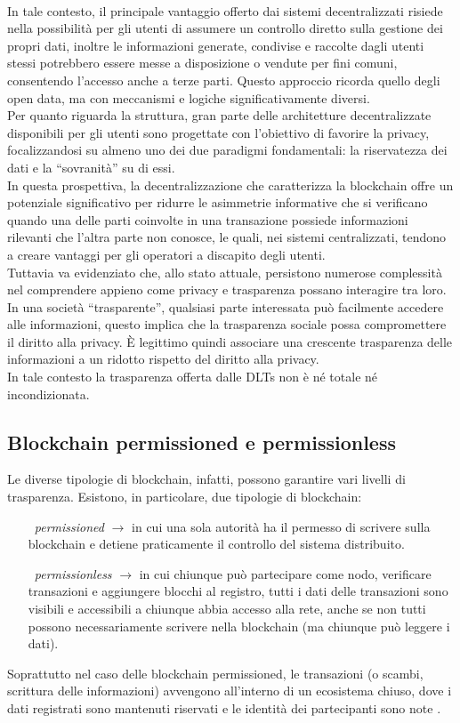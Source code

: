 \\In tale contesto, il principale vantaggio offerto dai sistemi decentralizzati risiede nella possibilità per gli utenti di assumere un controllo diretto sulla gestione dei propri dati, inoltre le informazioni generate, condivise e raccolte dagli utenti stessi potrebbero essere messe a disposizione o vendute per fini comuni,
consentendo l'accesso anche a terze parti. Questo approccio ricorda quello degli open data, ma con meccanismi e logiche significativamente diversi.
\\Per quanto riguarda la struttura, gran parte delle architetture decentralizzate disponibili per gli utenti sono progettate con l'obiettivo di favorire la privacy, focalizzandosi su almeno uno dei due paradigmi fondamentali: la riservatezza dei dati e la “sovranità” su di essi.
\\In questa prospettiva, la decentralizzazione che caratterizza la blockchain offre un potenziale significativo per ridurre le asimmetrie informative che si verificano quando una delle parti coinvolte in una transazione possiede informazioni rilevanti che l'altra parte non conosce, le quali, nei sistemi centralizzati, tendono a creare vantaggi per gli operatori a discapito degli utenti.
\\Tuttavia va evidenziato che, allo stato attuale, persistono numerose complessità nel comprendere appieno come privacy e trasparenza possano interagire tra loro.
\\In una società “trasparente”, qualsiasi parte interessata può facilmente accedere alle informazioni, questo implica che la trasparenza sociale possa compromettere il diritto alla privacy. \`E legittimo quindi associare una crescente trasparenza delle informazioni a un ridotto rispetto del diritto alla privacy.
\\In tale contesto la trasparenza offerta dalle DLTs non è né totale né incondizionata. 

\subsection{Blockchain permissioned e permissionless}
Le diverse tipologie di blockchain, infatti, possono garantire vari livelli di trasparenza. Esistono, in particolare, due tipologie di blockchain: 
\begin{itemize}
    \item[\textbullet\ \textit{permissioned} $\rightarrow$] in cui una sola autorità ha il permesso di scrivere sulla blockchain e detiene praticamente il controllo del sistema distribuito.
    \item[\textbullet\ \textit{permissionless} $\rightarrow$] in cui chiunque può partecipare come nodo, verificare transazioni e aggiungere blocchi al registro, tutti i dati delle transazioni sono visibili e accessibili a chiunque abbia accesso alla rete, anche se non tutti possono necessariamente scrivere nella blockchain (ma chiunque può leggere i dati).
\end{itemize}
Soprattutto nel caso delle blockchain permissioned, le transazioni (o scambi, scrittura delle informazioni) avvengono all’interno di un ecosistema chiuso, dove i dati registrati sono mantenuti riservati e le identità dei partecipanti sono note \cite{Blockchain_tecnologia_e_applicazioni_per_il_business}.
